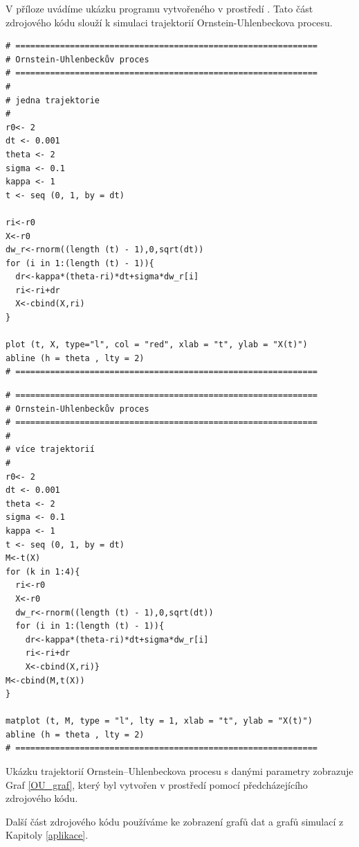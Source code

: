 \documentclass[a4paper,12pt]{report}
\makeatletter
\theoremstyle{definition} \newtheorem{definice}[veta]{Definice}
\theoremstyle{remark}
\def\R{\scalebox{\f@size}{\usebox\rbox}\xspace}
\makeatother
\begin{document}
V příloze uvádíme ukázku programu vytvořeného v prostředí \R. 
Tato část zdrojového kódu slouží k simulaci trajektorií Ornstein-Uhlenbeckova procesu.

\begin{verbatim}
# =============================================================
# Ornstein-Uhlenbeckův proces 
# =============================================================
#
# jedna trajektorie
#
r0<- 2
dt <- 0.001
theta <- 2
sigma <- 0.1
kappa <- 1
t <- seq (0, 1, by = dt)

ri<-r0
X<-r0
dw_r<-rnorm((length (t) - 1),0,sqrt(dt))    
for (i in 1:(length (t) - 1)){  
  dr<-kappa*(theta-ri)*dt+sigma*dw_r[i] 
  ri<-ri+dr
  X<-cbind(X,ri)
}

plot (t, X, type="l", col = "red", xlab = "t", ylab = "X(t)")
abline (h = theta , lty = 2)  
# =============================================================
\end{verbatim}

\newpage

\begin{verbatim}
# =============================================================
# Ornstein-Uhlenbeckův proces 
# =============================================================
#
# více trajektorií
#
r0<- 2
dt <- 0.001
theta <- 2
sigma <- 0.1
kappa <- 1
t <- seq (0, 1, by = dt)
M<-t(X)
for (k in 1:4){
  ri<-r0
  X<-r0
  dw_r<-rnorm((length (t) - 1),0,sqrt(dt))    
  for (i in 1:(length (t) - 1)){  
    dr<-kappa*(theta-ri)*dt+sigma*dw_r[i] 
    ri<-ri+dr
    X<-cbind(X,ri)}
M<-cbind(M,t(X))
}

matplot (t, M, type = "l", lty = 1, xlab = "t", ylab = "X(t)")
abline (h = theta , lty = 2)  
# =============================================================
\end{verbatim}

Ukázku trajektorií Ornstein–Uhlenbeckova procesu s danými parametry zobrazuje Graf \ref{OU_graf}, který byl vytvořen v prostředí \R pomocí předcházejícího zdrojového kódu.

\newpage
Další část zdrojového kódu používáme ke zobrazení grafů dat a grafů simulací z Kapitoly \ref{aplikace}.
\end{document}
